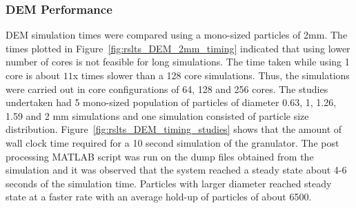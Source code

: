 \documentclass[preprint,11pt,authoryear]{elsarticle}
\begin{document}
\subsubsection{DEM Performance}
DEM simulation times were compared using a mono-sized particles of 2mm. The times plotted in
Figure~\ref{fig:rslts_DEM_2mm_timing} indicated that using lower number of
cores is not feasible for long simulations. The time taken while using 1
core is about $11$x times slower than a 128 core simulations. 
Thus, the simulations were carried out in core configurations of 64, 
128 and 256 cores. The studies undertaken had 5 mono-sized population 
of particles of diameter 0.63, 1, 1.26, 1.59 and 2 mm simulations 
and one simulation consisted of particle size distribution. 
Figure~\ref{fig:rslts_DEM_timing_studies} shows that the amount of wall clock time
required for a 10 second simulation of the granulator. The post processing
MATLAB script was run on the dump files obtained from the simulation and it
was observed that the system reached a steady state about 4-6 seconds of the
simulation time. Particles with larger diameter reached steady state at a
faster rate with an average hold-up of particles of about 6500.
\end{document}
